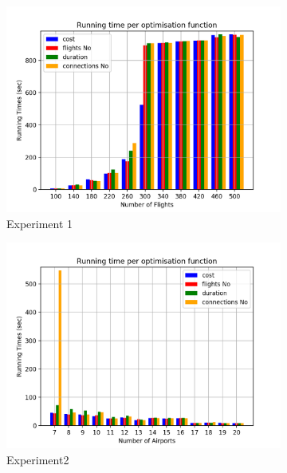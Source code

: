 \documentclass{mpaper}
\begin{document}
\begin{figure}
    \centering
    \begin{subfigure}[b]{0.4\textwidth}
        \includegraphics[width=\textwidth]{images/experiments/varym/varyM_obj.png}
        \caption{Experiment 1}
        \label{fig:exp1obj}
    \end{subfigure}
    \begin{subfigure}[b]{0.4\textwidth}
        \includegraphics[width=\textwidth]{images/experiments/varyn/varyN_obj.png}
        \caption{Experiment2}
        \label{fig:exp2obj}
    \end{subfigure}
    \begin{subfigure}[b]{0.4\textwidth}

\end{subfigure}
\end{figure}
\end{document}
